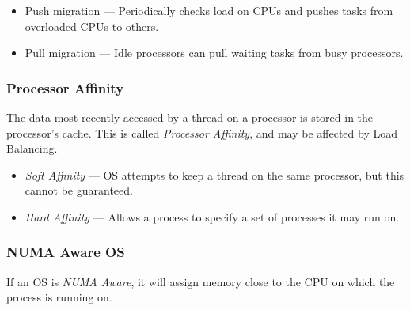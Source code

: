 \begin{itemize}
    \item Push migration --- Periodically checks load on CPUs and pushes tasks from overloaded CPUs to others.
    \item Pull migration --- Idle processors can pull waiting tasks from busy processors.
\end{itemize}

\subsubsection{Processor Affinity}

The data most recently accessed by a thread on a processor is stored in the processor's cache.
This is called \textit{Processor Affinity}, and may be affected by Load Balancing.

\begin{itemize}
    \item \textit{Soft Affinity} --- OS attempts to keep a thread on the same processor, but this cannot be guaranteed.
    \item \textit{Hard Affinity} --- Allows a process to specify a set of processes it may run on.
\end{itemize}


\subsubsection{NUMA Aware OS}

If an OS is \textit{NUMA Aware}, it will assign memory close to the CPU on which the process is running on.